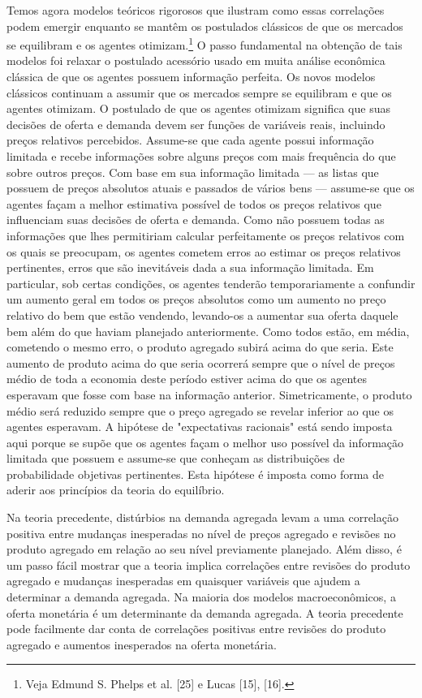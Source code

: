 \documentclass[12pt]{article}
\begin{document}
Temos agora modelos teóricos rigorosos que ilustram como essas correlações podem emergir enquanto se mantêm os postulados clássicos de que os mercados se equilibram e os agentes otimizam.\footnote{Veja Edmund S. Phelps et al. [25] e Lucas [15], [16].} O passo fundamental na obtenção de tais modelos foi relaxar o postulado acessório usado em muita análise econômica clássica de que os agentes possuem informação perfeita. Os novos modelos clássicos continuam a assumir que os mercados sempre se equilibram e que os agentes otimizam. O postulado de que os agentes otimizam significa que suas decisões de oferta e demanda devem ser funções de variáveis reais, incluindo preços relativos percebidos. Assume-se que cada agente possui informação limitada e recebe informações sobre alguns preços com mais frequência do que sobre outros preços. Com base em sua informação limitada — as listas que possuem de preços absolutos atuais e passados de vários bens — assume-se que os agentes façam a melhor estimativa possível de todos os preços relativos que influenciam suas decisões de oferta e demanda. Como não possuem todas as informações que lhes permitiriam calcular perfeitamente os preços relativos com os quais se preocupam, os agentes cometem erros ao estimar os preços relativos pertinentes, erros que são inevitáveis dada a sua informação limitada. Em particular, sob certas condições, os agentes tenderão temporariamente a confundir um aumento geral em todos os preços absolutos como um aumento no preço relativo do bem que estão vendendo, levando-os a aumentar sua oferta daquele bem além do que haviam planejado anteriormente. Como todos estão, em média, cometendo o mesmo erro, o produto agregado subirá acima do que seria. Este aumento de produto acima do que seria ocorrerá sempre que o nível de preços médio de toda a economia deste período estiver acima do que os agentes esperavam que fosse com base na informação anterior. Simetricamente, o produto médio será reduzido sempre que o preço agregado se revelar inferior ao que os agentes esperavam. A hipótese de "expectativas racionais" está sendo imposta aqui porque se supõe que os agentes façam o melhor uso possível da informação limitada que possuem e assume-se que conheçam as distribuições de probabilidade objetivas pertinentes. Esta hipótese é imposta como forma de aderir aos princípios da teoria do equilíbrio.

Na teoria precedente, distúrbios na demanda agregada levam a uma correlação positiva entre mudanças inesperadas no nível de preços agregado e revisões no produto agregado em relação ao seu nível previamente planejado. Além disso, é um passo fácil mostrar que a teoria implica correlações entre revisões do produto agregado e mudanças inesperadas em quaisquer variáveis que ajudem a determinar a demanda agregada. Na maioria dos modelos macroeconômicos, a oferta monetária é um determinante da demanda agregada. A teoria precedente pode facilmente dar conta de correlações positivas entre revisões do produto agregado e aumentos inesperados na oferta monetária.
\end{document}
